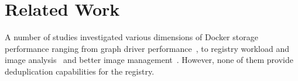 \section{Related Work}
\label{sec:related}


A number of studies investigated various dimensions of Docker storage
performance ranging from graph driver performance~\cite{slacker,docker-driver-eval,improve-cow-container-drivers}, to registry workload and image analysis~\cite{dockerworkload,dedupanalysis}
and better image management~\cite{shifter,exoclones}. However, none
of them provide deduplication capabilities for the registry.

